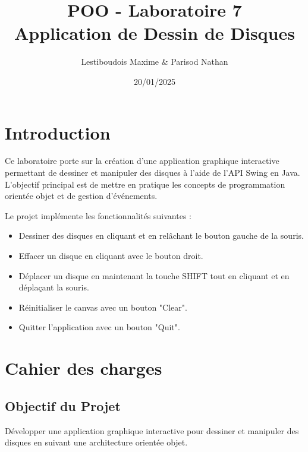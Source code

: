 \documentclass[12pt]{report}
\title{POO - Laboratoire 7 \\ \large Application de Dessin de Disques}
\author{Lestiboudois Maxime \& Parisod Nathan}
\date{20/01/2025}
\begin{document}
    \maketitle
    \tableofcontents
    \newpage


    \section*{Introduction}
    Ce laboratoire porte sur la création d'une application graphique interactive permettant de dessiner et manipuler des disques à l'aide de l'API Swing en Java.
    L'objectif principal est de mettre en pratique les concepts de programmation orientée objet et de gestion d'événements.

    Le projet implémente les fonctionnalités suivantes :
    \begin{itemize}
        \item Dessiner des disques en cliquant et en relâchant le bouton gauche de la souris.
        \item Effacer un disque en cliquant avec le bouton droit.
        \item Déplacer un disque en maintenant la touche SHIFT tout en cliquant et en déplaçant la souris.
        \item Réinitialiser le canvas avec un bouton "Clear".
        \item Quitter l'application avec un bouton "Quit".
    \end{itemize}

    \section*{Cahier des charges}
    \subsection*{Objectif du Projet}
    Développer une application graphique interactive pour dessiner et manipuler des disques en suivant une architecture orientée objet.
\end{document}
